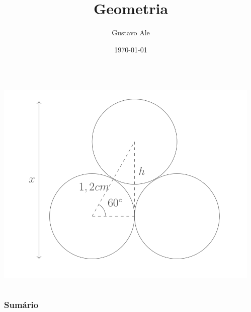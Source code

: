 \documentclass{beamer}
\title{Geometria} %
\author{Gustavo Ale} %
\institute[UFMT] %
{
EduCursinho - Faculdade de Engenharia \\ %
\medskip
\textit{gustavo.engca@gmail.com} %
}
\date{\today} %
\begin{document}
{
\begin{frame}
    \begin{columns}
        \begin{column}{0.48\textwidth}
            \includegraphics[width=\columnwidth,left]{../assets/geo.png}
        \end{column}
        \begin{column}{0.48\textwidth}
            \titlepage
        \end{column}
    \end{columns}

\end{frame}
}


\begin{frame}
    \frametitle{Sumário} %
    \tableofcontents %
\end{frame}
\end{document}
